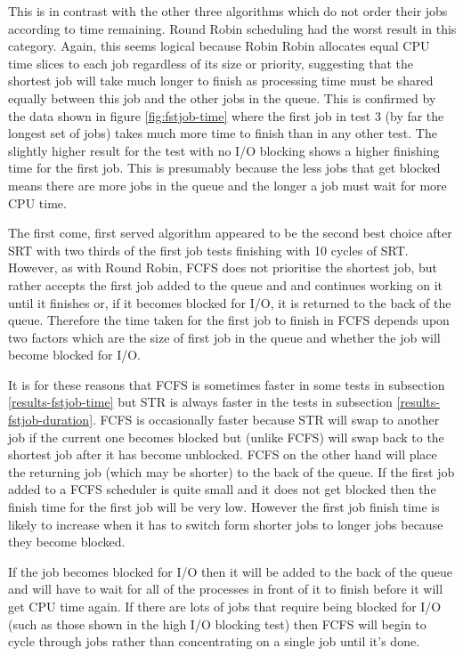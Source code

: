 \documentclass{acm_proc_article-sp}
\begin{document}
This is in contrast with the other three algorithms which do not order their jobs according to time remaining. Round Robin scheduling had the worst result in this category. Again, this seems logical because Robin Robin allocates equal CPU time slices to each job regardless of its size or priority, suggesting that the shortest job will take much longer to finish as processing time must be shared equally between this job and the other jobs in the queue. This is confirmed by the data shown in figure \ref{fig:fstjob-time} where the first job in test 3 (by far the longest set of jobs) takes much more time to finish than in any other test. The slightly higher result for the test with no I/O blocking shows a higher finishing time for the first job. This is presumably because the less jobs that get blocked means there are more jobs in the queue and the longer a job must wait for more CPU time.

The first come, first served algorithm appeared to be the second best choice after SRT with two thirds of the first job tests finishing with 10 cycles of SRT. However, as with Round Robin, FCFS does not prioritise the shortest job, but rather accepts the first job added to the queue and and continues working on it until it finishes or, if it becomes blocked for I/O, it is returned to the back of the queue. Therefore the time taken for the first job to finish in FCFS depends upon two factors which are the size of first job in the queue and whether the job will become blocked for I/O. 

It is for these reasons that FCFS is sometimes faster in some tests in subsection \ref{results-fstjob-time} but STR is always faster in the tests in subsection \ref{results-fstjob-duration}. FCFS is occasionally faster because STR will swap to another job if the current one becomes blocked but (unlike FCFS) will swap back to the shortest job after it has become unblocked. FCFS on the other hand will place the returning job (which may be shorter) to the back of the queue. If the first job added to a FCFS scheduler is quite small and it does not get blocked then the finish time for the first job will be very low. However the first job finish time is likely to increase when it has to switch form shorter jobs to longer jobs because they become blocked.

If the job becomes blocked for I/O then it will be added to the back of the queue and will have to wait for all of the processes in front of it to finish before it will get CPU time again. If there are lots of jobs that require being blocked for I/O (such as those shown in the high I/O blocking test) then FCFS will begin to cycle through jobs rather than concentrating on a single job until it's done.
\end{document}
